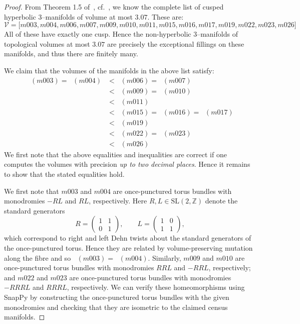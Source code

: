 \documentclass[a4paper]{gtart}
\theoremstyle{definition}
\theoremstyle{remark}
\numberwithin{equation}{section}
\DeclareMathOperator{\volh}{vol_{\mathbb{H}}}
\begin{document}
\begin{proof}
From Theorem 1.5 of~\cite{GHMTY21}, cf.~\cite{Mi09}, we know the complete list of cusped hyperbolic 3--manifolds of volume at most $3.07$. These are:
$$\mathcal{V}=\big[m003,m004,m006,m007,m009,m010,m011,m015,m016,m017, m019, m022, m023, m026\big]$$
All of these have exactly one cusp. Hence the non-hyperbolic 3--manifolds of topological volumes at most $3.07$ are precisely the exceptional fillings on these manifolds, and thus there are finitely many.

We claim that the volumes of the manifolds in the above list satisfy:
\begin{align*}
\volh(m003) = \volh(m004) &< \volh(m006) = \volh(m007) \\
&< \volh(m009) = \volh(m010)\\
&< \volh(m011)\\
&< \volh(m015) = \volh(m016)= \volh(m017)\\
&< \volh(m019)\\
&< \volh(m022) = \volh(m023)\\
&< \volh(m026)
\end{align*}
We first note that the above equalities and inequalities are correct if one computes
the volumes with precision \emph{up to two decimal places}. Hence it remains to show that the stated equalities hold. 

We first note that $m003$ and $m004$ are once-punctured torus bundles with monodromies $-RL$ and $RL$, respectively. 
Here $R,L \in \mathrm{SL}(2,\mathbb{Z})$ denote the standard generators
\[
R=\begin{pmatrix}1&1\\0&1\end{pmatrix}, \qquad 
L=\begin{pmatrix}1&0\\1&1\end{pmatrix},
\]
which correspond to right and left Dehn twists about the standard generators of the once-punctured torus. 
Hence they are related by volume-preserving mutation along the fibre and so $\volh(m003)=\volh(m004)$.
Similarly, $m009$ and $m010$ are once-punctured torus bundles with monodromies $RRL$ and $-RRL$, respectively; and $m022$ and $m023$ are once-punctured torus bundles with monodromies $-RRRL$ and $RRRL$, respectively. 
We can verify these homeomorphisms using SnapPy by constructing the once-punctured torus bundles with the given monodromies and checking that they are isometric to the claimed census manifolds.


\end{proof}
\end{document}
